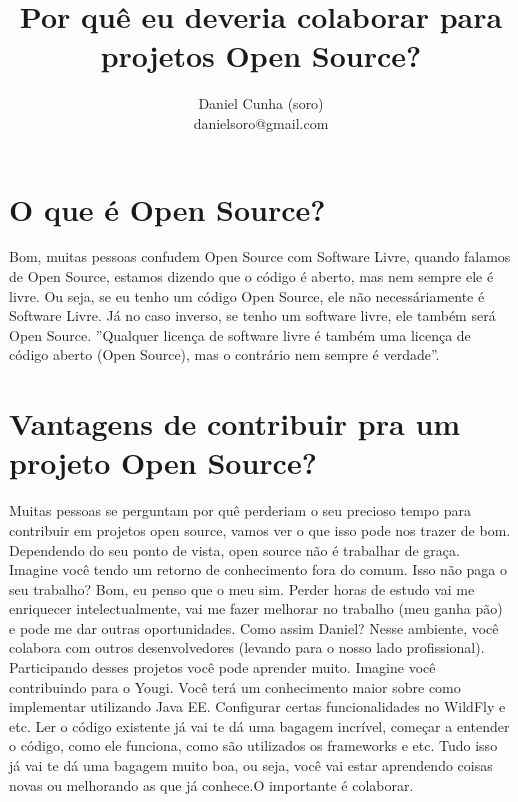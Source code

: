 \documentclass[a4paper,11pt]{article}
\title{Por quê eu deveria colaborar para projetos Open Source?}
\author{Daniel Cunha (soro) \\ danielsoro@gmail.com}
\begin{document}
\maketitle
\newpage
\tableofcontents
\newpage

\section{O que é Open Source?}
Bom, muitas pessoas confudem Open Source com Software Livre, quando falamos de Open Source, estamos dizendo que o código é aberto, mas nem sempre ele é livre. Ou seja, se eu tenho um código Open Source, ele não necessáriamente é Software Livre. Já no caso inverso, se tenho um software livre, ele também será Open Source.\newline\newline
''Qualquer licença de software livre é também uma licença de código aberto (Open Source), mas o contrário nem sempre é verdade''.

\section{Vantagens de contribuir pra um projeto Open Source?}
  Muitas pessoas se perguntam por quê perderiam o seu precioso tempo para contribuir em projetos open source, vamos ver o que isso pode nos trazer de bom.\newline\newline
Dependendo do seu ponto de vista, open source não é trabalhar de graça. Imagine você tendo um retorno de conhecimento fora do comum. Isso não paga o seu trabalho? Bom, eu penso que o meu sim. Perder horas de estudo vai me enriquecer intelectualmente, vai me fazer melhorar no trabalho (meu ganha pão) e pode me dar outras oportunidades.\newline\newline
Como assim Daniel?
Nesse ambiente, você colabora com outros desenvolvedores (levando para o nosso lado profissional). Participando desses projetos você pode aprender muito. Imagine você contribuindo para o Yougi. Você terá um conhecimento maior sobre como implementar utilizando Java EE. Configurar certas funcionalidades no WildFly e etc.\newline\newline
Ler o código existente já vai te dá uma bagagem incrível, começar a entender o código, como ele funciona, como são utilizados os frameworks e etc. Tudo isso já vai te dá uma bagagem muito boa, ou seja, você vai estar aprendendo coisas novas ou melhorando as que já conhece.O importante é colaborar.
\end{document}
